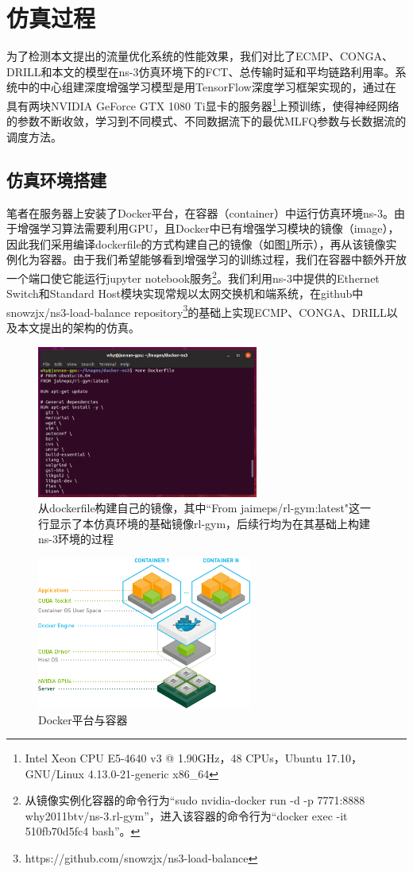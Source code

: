 \section{仿真过程}
为了检测本文提出的流量优化系统的性能效果，我们对比了ECMP、CONGA、DRILL和本文的模型在ns-3仿真环境下的FCT、总传输时延和平均链路利用率。系统中的中心组建深度增强学习模型是用TensorFlow深度学习框架\cite{tensorflow}实现的，通过在具有两块NVIDIA GeForce GTX 1080 Ti显卡的服务器\footnote{Intel Xeon CPU E5-4640 v3 @ 1.90GHz，48 CPUs，Ubuntu 17.10，GNU/Linux 4.13.0-21-generic x86\_64}上预训练，使得神经网络的参数不断收敛，学习到不同模式、不同数据流下的最优MLFQ参数与长数据流的调度方法。
\subsection{仿真环境搭建}
笔者在服务器上安装了Docker平台\cite{docker}，在容器（container）中运行仿真环境ns-3。由于增强学习算法需要利用GPU，且Docker中已有增强学习模块的镜像（image），因此我们采用编译dockerfile的方式构建自己的镜像（如图\ref{fig:merge}所示），再从该镜像实例化为容器。由于我们希望能够看到增强学习的训练过程，我们在容器中额外开放一个端口使它能运行jupyter notebook服务\footnote{从镜像实例化容器的命令行为“sudo nvidia-docker run -d -p 7771:8888 why2011btv/ns-3.rl-gym”，进入该容器的命令行为“docker exec -it 510fb70d5fc4 bash”。}。我们利用ns-3中提供的Ethernet Switch和Standard Host模块实现常规以太网交换机和端系统，在github中snowzjx/ns3-load-balance repository\footnote{https://github.com/snowzjx/ns3-load-balance}的基础上实现ECMP、CONGA、DRILL以及本文提出的架构的仿真。

\begin{figure}[ht]
\centering
\includegraphics[height=5cm]{figure/merge.png}
\caption{从dockerfile构建自己的镜像，其中``From jaimeps/rl-gym:latest"这一行显示了本仿真环境的基础镜像rl-gym，后续行均为在其基础上构建ns-3环境的过程}
\label{fig:merge}
\end{figure}

\begin{figure}[ht]
\centering
\includegraphics[height=5cm]{figure/docker.png}
\caption{Docker平台与容器}
\label{fig:docker}
\end{figure}



